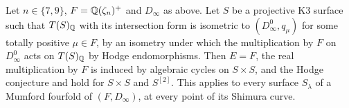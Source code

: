 \begin{theorem}\label{thm:zeta9}
Let $n\in\{7,9\}$, $F=\mathbb{Q}(\zeta_{n})^{+}$ and $D_{\infty}$ as above. Let $S$ be a projective K3 surface such that $T(S)_{\mathbb{Q}}$ with its intersection form is isometric to $(D_{\infty}^{0},q_{\mu})$ for some totally positive $\mu\in F$, by an isometry under which the multiplication by $F$ on $D_{\infty}^{0}$ acts on $T(S)_{\mathbb{Q}}$ by Hodge endomorphisms. Then $E=F$, the real multiplication by $F$ is induced by algebraic cycles on $S\times S$, and the Hodge conjecture and \Fiii{} hold for $S\times S$ and $S^{[2]}$. This applies to every surface $S_{\lambda}$ of a Mumford fourfold of $(F,D_{\infty})$, at every point of its Shimura curve.
\end{theorem}

